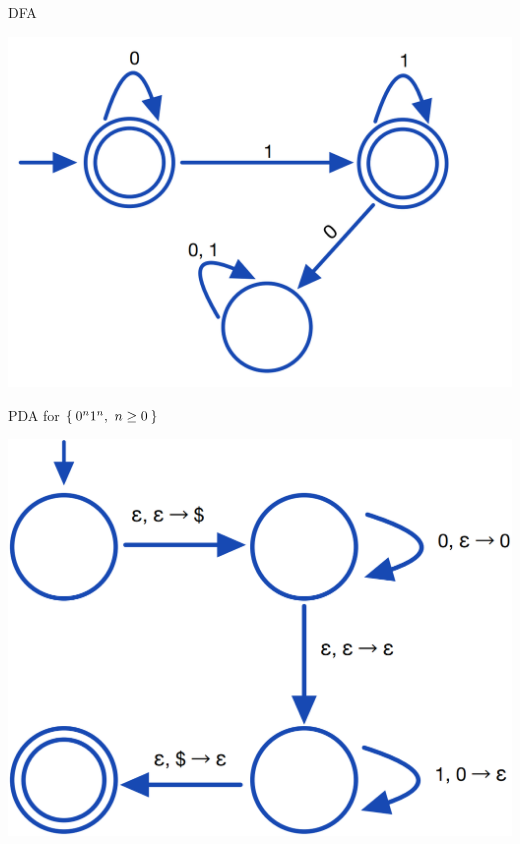 \documentclass[aspectratio=169]{beamer}
\begin{document}
\begin{frame}{DFA}
    \begin{center}
        \includegraphics[scale=0.30]{images/01.png}
    \end{center}
\end{frame}

\begin{frame}{PDA for $\Set{0^n 1^n,\ n \geq 0}$}
    \begin{center}
        \includegraphics[scale=0.30]{images/PDA_1.png}
    \end{center}
\end{frame}
\end{document}
